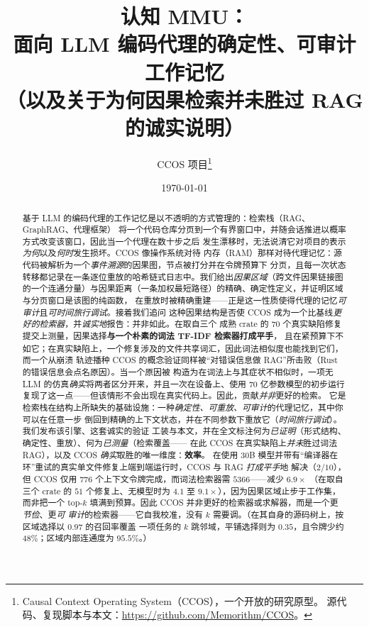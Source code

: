 \documentclass[11pt]{ctexart}
\title{\textbf{认知 MMU：\\ 面向 LLM 编码代理的确定性、可审计工作记忆\\ \large （以及关于为何因果检索并未胜过 RAG 的诚实说明）}}
\author{CCOS 项目\thanks{Causal Context Operating System（CCOS），一个开放的研究原型。
源代码、复现脚本与本文：\url{https://github.com/Memorithm/CCOS}。}}
\date{\today}
\begin{document}
\maketitle

\begin{abstract}
基于 LLM 的编码代理的工作记忆是以不透明的方式管理的：检索栈（RAG、GraphRAG、代理框架）
将一个代码仓库分页到一个有界窗口中，并随会话推进以概率方式改变该窗口，因此当一个代理在数十步之后
发生漂移时，无法说清它对项目的表示\emph{为何}以及\emph{何时}发生损坏。CCOS 像操作系统对待
内存（RAM）那样对待代理记忆：源代码被解析为一个\emph{事件溯源}的因果图，节点被打分并在令牌预算下
分页，且每一次状态转移都记录在一条逐位重放的哈希链式日志中。我们给出\emph{因果区域}（跨文件因果链接图
的一个连通分量）与因果距离（一条加权最短路径）的精确、确定性定义，并证明区域与分页窗口是该图的纯函数，
在重放时被精确重建——正是这一性质使得代理的记忆\emph{可审计}且\emph{可时间旅行调试}。接着我们追问
这种因果结构是否使 CCOS 成为一个比基线\emph{更好的检索器}，并\emph{诚实地}报告：并非如此。在取自三个
成熟 crate 的 $70$ 个真实缺陷修复提交上测量，因果选择\textbf{与一个朴素的词法 TF-IDF 检索器打成平手}，
且在紧预算下不如它；在真实缺陷上，一个修复涉及的文件共享词汇，因此词法相似度也能找到它们，而一个从崩溃
轨迹播种 CCOS 的概念验证同样被“对错误信息做 RAG”所击败（Rust 的错误信息会点名原因）。当一个原因被
构造为在词法上与其症状不相似时，一项无 LLM 的仿真\emph{确实}将两者区分开来，并且一次在设备上、使用
$70$ 亿参数模型的初步运行复现了这一点——但该情形不会出现在真实代码上。因此，贡献\emph{并非}更好的检索。
它是检索栈在结构上所缺失的基础设施：一种\emph{确定性、可重放、可审计}的代理记忆，其中你可以在任意一步
倒回到精确的上下文状态，并在不同参数下重放它（\emph{时间旅行调试}）。我们发布该引擎、这套诚实的验证
工装与本文，并在全文标注何为\emph{已证明}（形式结构、确定性、重放）、何为\emph{已测量}（检索覆盖——
在此 CCOS 在真实缺陷上\emph{并未}胜过词法 RAG），以及 CCOS \emph{确实}取胜的唯一维度：\textbf{效率}。
在使用 30B 模型并带有“编译器在环”重试的真实单文件修复上端到端运行时，CCOS 与 RAG \emph{打成平手}地
解决（$2/10$），但 CCOS 仅用 $776$ 个上下文令牌完成，而词法检索器需 $5366$——减少 $6.9\times$
（在取自三个 crate 的 $51$ 个修复上、无模型时为 $4.1$ 至 $9.1\times$），因为因果区域止步于工作集，
而非把一个 top-$k$ 填满到预算。因此 CCOS 并非更好的检索器或求解器，而是一个更\emph{节俭}、更\emph{可
审计}的检索器——它自我校准，没有 $k$ 需要调。（在其自身的源码树上，按区域选择以 $0.97$ 的召回率覆盖
一项任务的 $k$ 跳邻域，平铺选择则为 $0.35$，且令牌少约 $48\%$；区域内部连通度为 $95.5\%$。）
\end{abstract}
\end{document}
